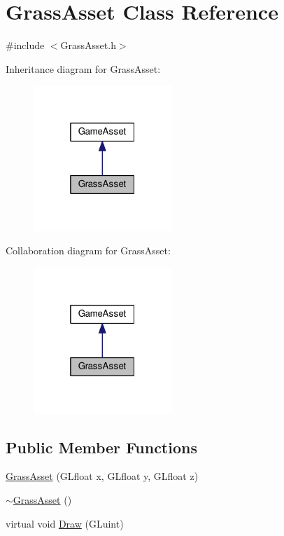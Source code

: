 \hypertarget{classGrassAsset}{}\section{Grass\+Asset Class Reference}
\label{classGrassAsset}


{\ttfamily \#include $<$Grass\+Asset.\+h$>$}



Inheritance diagram for Grass\+Asset\+:\nopagebreak
\begin{figure}[H]
\begin{center}
\leavevmode
\includegraphics[width=148pt]{classGrassAsset__inherit__graph}
\end{center}
\end{figure}


Collaboration diagram for Grass\+Asset\+:\nopagebreak
\begin{figure}[H]
\begin{center}
\leavevmode
\includegraphics[width=148pt]{classGrassAsset__coll__graph}
\end{center}
\end{figure}
\subsection*{Public Member Functions}
\begin{DoxyCompactItemize}
\item 
\hyperlink{classGrassAsset_a961ec7133a9fc6f16a7347a122f95952}{Grass\+Asset} (G\+Lfloat x, G\+Lfloat y, G\+Lfloat z)
\item 
\hyperlink{classGrassAsset_a07e2206bacd2ec120f27f20e5df635b7}{$\sim$\+Grass\+Asset} ()
\item 
virtual void \hyperlink{classGrassAsset_a0178a72c5bf2f00bcc6a240b851f3a25}{Draw} (G\+Luint)
\end{DoxyCompactItemize}



